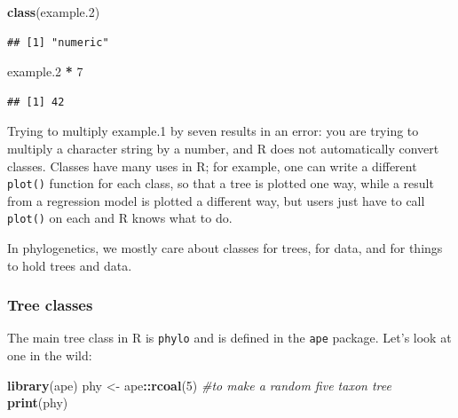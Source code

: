\documentclass[]{article}
\newenvironment{Shaded}{\begin{snugshade}}{\end{snugshade}}
\newcommand{\CommentTok}[1]{\textcolor[rgb]{0.56,0.35,0.01}{\textit{#1}}}
\newcommand{\DecValTok}[1]{\textcolor[rgb]{0.00,0.00,0.81}{#1}}
\newcommand{\FloatTok}[1]{\textcolor[rgb]{0.00,0.00,0.81}{#1}}
\newcommand{\KeywordTok}[1]{\textcolor[rgb]{0.13,0.29,0.53}{\textbf{#1}}}
\newcommand{\NormalTok}[1]{#1}
\newcommand{\OperatorTok}[1]{\textcolor[rgb]{0.81,0.36,0.00}{\textbf{#1}}}
\newcommand{\StringTok}[1]{\textcolor[rgb]{0.31,0.60,0.02}{#1}}
\begin{document}
\begin{Shaded}
\begin{Highlighting}[]
\KeywordTok{class}\NormalTok{(example}\FloatTok{.2}\NormalTok{)}
\end{Highlighting}
\end{Shaded}

\begin{verbatim}
## [1] "numeric"
\end{verbatim}

\begin{Shaded}
\begin{Highlighting}[]
\NormalTok{example}\FloatTok{.2} \OperatorTok{*}\StringTok{ }\DecValTok{7}
\end{Highlighting}
\end{Shaded}

\begin{verbatim}
## [1] 42
\end{verbatim}

Trying to multiply example.1 by seven results in an error: you are trying to multiply a character string by a number, and R does not automatically convert classes. Classes have many uses in R; for example, one can write a different \texttt{plot()} function for each class, so that a tree is plotted one way, while a result from a regression model is plotted a different way, but users just have to call \texttt{plot()} on each and R knows what to do.

In phylogenetics, we mostly care about classes for trees, for data, and for things to hold trees and data.

\hypertarget{tree-classes}{%
\subsubsection{Tree classes}\label{tree-classes}}

The main tree class in R is \texttt{phylo} and is defined in the \texttt{ape} package. Let's look at one in the wild:

\begin{Shaded}
\begin{Highlighting}[]
\KeywordTok{library}\NormalTok{(ape)}
\NormalTok{phy <-}\StringTok{ }\NormalTok{ape}\OperatorTok{::}\KeywordTok{rcoal}\NormalTok{(}\DecValTok{5}\NormalTok{) }\CommentTok{#to make a random five taxon tree}
\KeywordTok{print}\NormalTok{(phy)}
\end{Highlighting}
\end{Shaded}
\end{document}
